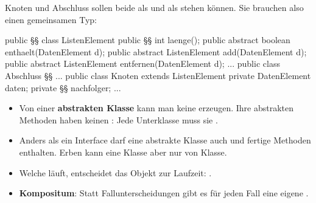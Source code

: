\documentclass[11pt,a4paper]{article}
\begin{document}
\begin{minipage}[t]{0.535\linewidth}
\vspace{0pt}
Knoten und Abschluss sollen beide als  und als  stehen können. Sie brauchen also einen gemeinsamen Typ:\\[-1mm]
\begin{java}[basicstyle=\ttfamily\scriptsize]
public §§ class ListenElement {
   public §§ int laenge();
   public abstract boolean enthaelt(DatenElement d);
   public abstract ListenElement add(DatenElement d);
   public abstract ListenElement entfernen(DatenElement d);
   ...
}
public class Abschluss §§ { ... }
public class Knoten extends ListenElement {
   private DatenElement daten;
   private §§ nachfolger;
   ...
}
\end{java}
\end{minipage}\hfill
\begin{minipage}[t]{0.445\linewidth}
\vspace{0pt}
\begin{merke}
\small
\begin{itemize}
\item Von einer \textbf{abstrakten Klasse} kann man keine  erzeugen. Ihre abstrakten Methoden haben keinen : Jede Unterklasse muss sie .
\item Anders als ein Interface darf eine abstrakte Klasse auch  und fertige Methoden enthalten. Erben kann eine Klasse aber nur von  Klasse.
\item Welche  läuft, entscheidet das Objekt zur Laufzeit: .
\item \textbf{Kompositum}: Statt Fallunterscheidungen gibt es für jeden Fall eine eigene .
\end{itemize}
\end{merke}
\end{minipage}
\end{document}
